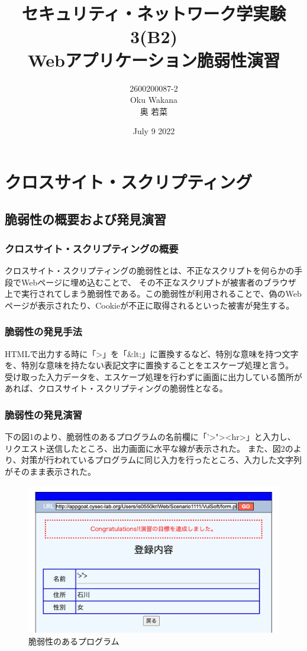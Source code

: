 \documentclass[dvipdfmx,autodetect-engine,titlepage]{jsarticle}
\title{セキュリティ・ネットワーク学実験3(B2)\\
Webアプリケーション脆弱性演習\\
}
\author{2600200087-2\\Oku Wakana\\奥 若菜}
\date{July 9 2022}
\begin{document}
\maketitle

\section{クロスサイト・スクリプティング}
\subsection{脆弱性の概要および発見演習}
\subsubsection{クロスサイト・スクリプティングの概要}
クロスサイト・スクリプティングの脆弱性とは、不正なスクリプトを何らかの手段でWebページに埋め込むことで、
その不正なスクリプトが被害者のブラウザ上で実行されてしまう脆弱性である。この脆弱性が利用されることで、偽のWebページが表示されたり、Cookieが不正に取得されるといった被害が発生する。\\
\subsubsection{脆弱性の発見手法}
HTMLで出力する時に「\textgreater」を「\&lt;」に置換するなど、特別な意味を持つ文字を、特別な意味を持たない表記文字に置換することをエスケープ処理と言う。
受け取った入力データを、エスケープ処理を行わずに画面に出力している箇所があれば、クロスサイト・スクリプティングの脆弱性となる。\\

\subsubsection{脆弱性の発見演習}
下の図1のより、脆弱性のあるプログラムの名前欄に「'\textgreater "\textgreater \textless hr\textgreater」と入力し、リクエスト送信したところ、出力画面に水平な線が表示された。
また、図2のより、対策が行われているプログラムに同じ入力を行ったところ、入力した文字列がそのまま表示された。\\
\begin{figure}[H]
  \centering
  \includegraphics[scale=0.35]{web2.png}
  \caption{脆弱性のあるプログラム}\label{fig:図2}
\end{figure}
\end{document}

